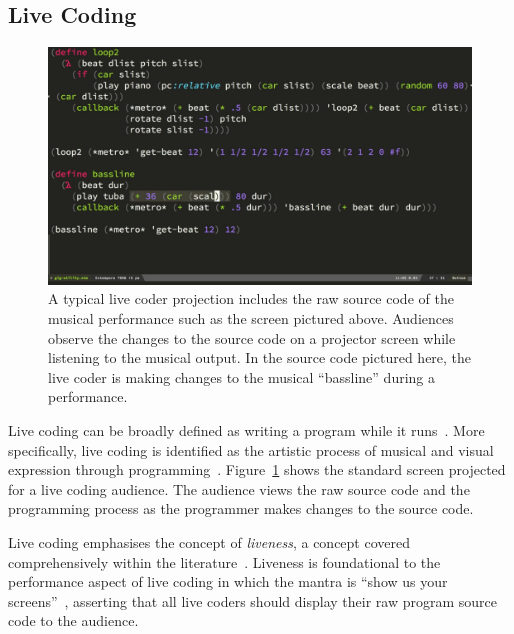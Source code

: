 \subsection{Live Coding}

\begin{figure}
\centering
\includegraphics[width=1.0\textwidth]{../images/code/live-coding-screen.png}
\caption[A typical live coder projection]{A typical live coder projection includes the raw source code of the musical performance such as the screen pictured above. Audiences observe the changes to the source code on a projector screen while listening to the musical output. In the source code pictured here, the live coder is making changes to the musical ``bassline'' during a performance.}
\label{fig:live-coding-screen}
\end{figure}


Live coding can be broadly defined as writing a program while it runs~\cite{Ward2004}. More specifically, live coding is identified as the artistic process of musical and visual expression through programming~\cite{Collins2003}. Figure~\ref{fig:live-coding-screen} shows the standard screen projected for a live coding audience. The audience views the raw source code and the programming process as the programmer makes changes to the source code.

Live coding emphasises the concept of \emph{liveness}, a concept covered comprehensively within the literature~\cite{Auslander,Masura2007}. Liveness is foundational to the performance aspect of live coding in which the mantra is ``show us your screens''~\cite{Toplap}, asserting that all live coders should display their raw program source code to the audience.

